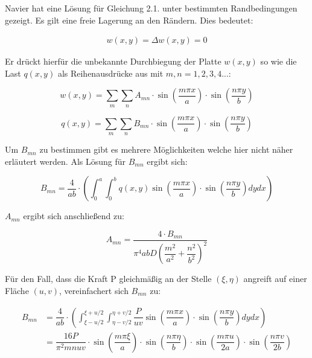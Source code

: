 Navier hat eine Lösung für Gleichung 2.1. unter bestimmten Randbedingungen gezeigt. 
Es gilt eine freie Lagerung an den Rändern. Dies bedeutet:

\begin{align}
 \tag{x = 0,a \qquad y = 0,b}w(x,y) = \Delta w(x,y) = 0	
\end{align}


Er drückt hierfür die unbekannte Durchbiegung der Platte $w(x,y)$ so wie die Last $q(x,y)$ als Reihenausdrücke aus mit $m,n = 1,2,3,4...$:

\begin{equation} 
w(x,y) = \sum_m \sum_n A_{mn} \cdot \sin\left(\dfrac{m \pi x}{a}\right) \cdot \sin\left(\dfrac{n \pi y}{b}\right)
\end{equation} 

\begin{equation} 
q(x,y) = \sum_m \sum_n B_{mn} \cdot \sin\left(\dfrac{m \pi x}{a}\right) \cdot \sin\left(\dfrac{n \pi y}{b}\right)
\end{equation} 

Um $B_{mn}$ zu bestimmen gibt es mehrere Möglichkeiten welche hier nicht näher erläutert werden. Als Lösung für $B_{mn}$ ergibt sich:


\begin{equation}
B_{mn} = \dfrac{4}{ab} \cdot \left( \int_0^a \int_0^b q(x,y) 
\sin\left(\dfrac{m \pi x}{a}\right) \cdot \sin\left( \dfrac{n \pi y}{b}\right) dy dx\right)
\end{equation}

$A_{mn}$ ergibt sich anschließend zu:

\begin{equation}
A_{mn} = \dfrac{4 \cdot B_{mn}}{\pi^4 a b D \left(\dfrac{m^2}{a^2} + \dfrac{n^2}{b^2} \right)^2}
\end{equation}

Für den Fall, dass die Kraft P gleichmäßig an der Stelle $(\xi, \eta)$ angreift auf einer Fläche $(u,v)$, vereinfachert sich $B_{mn}$ zu:



\begin{align}
B_{mn} &= \dfrac{4}{ab} \cdot \left( \int_{\xi-u/2}^{\xi+u/2} \int_{\eta - v/2}^{\eta + v/2} \dfrac{P}{u v}
\sin\left(\dfrac{m \pi x}{a}\right) \cdot \sin\left( \dfrac{n \pi y}{b} \right)dy dx\right) \\
&= \dfrac{16P}{\pi^2 m n u v} 
\cdot \sin\left(\dfrac{m \pi \xi}{a}\right) 
\cdot \sin\left(\dfrac{n \pi \eta}{b}\right) 
\cdot \sin\left(\dfrac{m \pi u}{2a}\right) 
\cdot \sin\left(\dfrac{n \pi v}{2b}\right)
\end{align}


